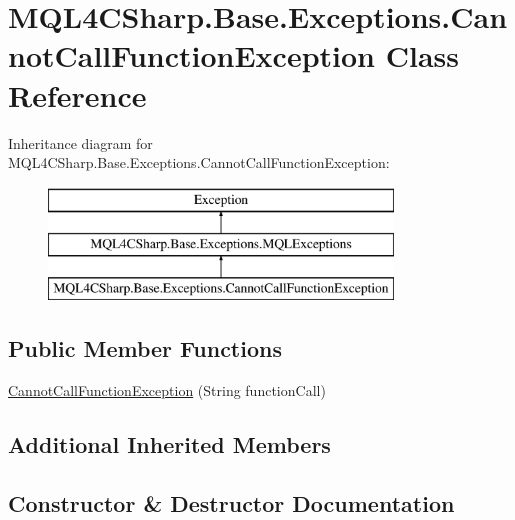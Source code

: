 \hypertarget{class_m_q_l4_c_sharp_1_1_base_1_1_exceptions_1_1_cannot_call_function_exception}{}\section{M\+Q\+L4\+C\+Sharp.\+Base.\+Exceptions.\+Cannot\+Call\+Function\+Exception Class Reference}
\label{class_m_q_l4_c_sharp_1_1_base_1_1_exceptions_1_1_cannot_call_function_exception}
Inheritance diagram for M\+Q\+L4\+C\+Sharp.\+Base.\+Exceptions.\+Cannot\+Call\+Function\+Exception\+:\begin{figure}[H]
\begin{center}
\leavevmode
\includegraphics[height=3.000000cm]{class_m_q_l4_c_sharp_1_1_base_1_1_exceptions_1_1_cannot_call_function_exception}
\end{center}
\end{figure}
\subsection*{Public Member Functions}
\begin{DoxyCompactItemize}
\item 
\hyperlink{class_m_q_l4_c_sharp_1_1_base_1_1_exceptions_1_1_cannot_call_function_exception_af727841d6f552c4f7dfc415fc24862e7}{Cannot\+Call\+Function\+Exception} (String function\+Call)
\end{DoxyCompactItemize}
\subsection*{Additional Inherited Members}


\subsection{Constructor \& Destructor Documentation}
